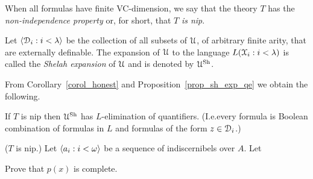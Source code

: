 When all formulas have finite VC-dimension, we say that the theory $T$ has the \emph{non-independence property\/} or, for short, that $T$ \emph{is nip}.

Let $\langle\EuScript D_i:i<\lambda\rangle$ be the collection of all subsets of $\EuScript U$, of arbitrary finite arity, that are externally definable. The expansion of $\EuScript U$ to the language $L(\EuScript X_i:i<\lambda)$ is called the \emph{Shelah expansion\/} of $\EuScript U$ and is denoted by \emph{$\EuScript U^{\rm Sh}$}. 

From Corollary~\ref{corol_honest} and Proposition~\ref{prop_sh_exp_qe} we obtain the following.

\begin{corollary}\label{corol_sh_exp_qe}
If $T$ is nip then $\EuScript U^{\rm Sh}$ has $L$-elimination of quantifiers. (I.e.\@ every formula is Boolean combination of formulas in $L$ and formulas of the form $z\in\EuScript D_i$.)\QED
\end{corollary}

\begin{exercise}
  ($T$ is nip.)
  Let $\langle a_i:i<\omega\rangle$ be a sequence of indiscernibels over $A$.
  Let 
  

  Prove that $p(x)$ is complete.\QED
\end{exercise}


